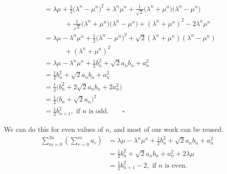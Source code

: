 \documentclass[12pt]{article}
\begin{document}
\begin{align*}
                                                    & = \lambda\mu + \frac{1}{2} \bigg(\lambda^n - \mu^n \bigg)^2 + \lambda^n\mu^n + \frac{1}{\sqrt{2}} \bigg(\lambda^n + \mu^n \bigg) \bigg(\lambda^n - \mu^n \bigg)                                \\
                                                    & \phantom{++}\quad + \frac{1}{\sqrt{2}} \bigg(\lambda^n + \mu^n \bigg) \bigg(\lambda^n - \mu^n \bigg) + (\lambda^n + \mu^n)^2 - 2\lambda^n\mu^n                                                 \\
                                                    & = \lambda\mu - \lambda^n\mu^n + \frac{1}{2} \bigg(\lambda^n - \mu^n \bigg)^2 + \sqrt{2} (\lambda^n + \mu^n)(\lambda^n - \mu^n)                                                                 \\
                                                    & \phantom{++}\quad + (\lambda^n + \mu^n)^2                                                                                                                                                      \\
                                                    & = \lambda\mu - \lambda^n\mu^n + \frac{1}{2} b^2_n + \sqrt{2} a_n b_n + a^2_n                                                                                                                   \\
                                                    & = \frac{1}{2} b^2_n + \sqrt{2} a_n b_n + a^2_n                                                                                                                                                 \\
                                                    & = \frac{1}{2} \bigg(b^2_n + 2\sqrt{2} a_n b_n + 2a^2_n \bigg)                                                                                                                                  \\
                                                    & = \frac{1}{2} \bigg(b_n + \sqrt{2} a_n \bigg)^2                                                                                                                                                \\
                                                    & = \frac{1}{2} b^2_{n+1}, \text{ if $n$ is odd}. \qquad \square
\end{align*}

We can do this for even values of $n$, and most of our work can be reused.
\begin{align*}
    \sum_{m=0}^{2n} \left(\sum_{r=0}^{m} a_r\right) & = \lambda\mu - \lambda^n\mu^n + \frac{1}{2} b^2_n + \sqrt{2} a_n b_n + a^2_n \\
                                                    & = \frac{1}{2} b^2_n + \sqrt{2} a_n b_n + a^2_n + 2\lambda\mu                 \\
                                                    & = \frac{1}{2} b^2_{n+1} - 2, \text{ if $n$ is even}.
\end{align*}
\end{document}
